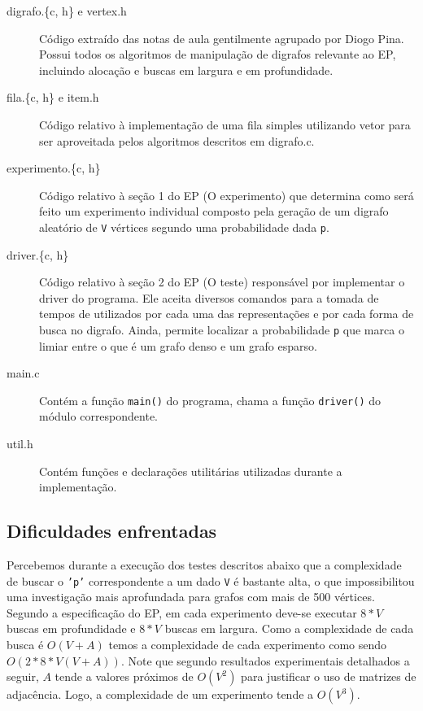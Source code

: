 \documentclass[brazil,times]{abnt}
\begin{document}
\begin{description}
	\item[digrafo.\{c, h\} e vertex.h] Código extraído das notas de aula gentilmente agrupado por Diogo Pina. Possui todos os algoritmos de manipulação de digrafos relevante ao EP, incluindo alocação e buscas em largura e em profundidade.
	\item[fila.\{c, h\} e item.h] Código relativo à implementação de uma fila simples utilizando vetor para ser aproveitada pelos algoritmos descritos em digrafo.c.
	\item[experimento.\{c, h\}] Código relativo à seção 1 do EP (O experimento) que determina como será feito um experimento individual composto pela geração de um digrafo aleatório de \texttt{V} vértices segundo uma probabilidade dada \texttt{p}.
	\item[driver.\{c, h\}] Código relativo à seção 2 do EP (O teste) responsável por implementar o driver do programa. Ele aceita diversos comandos para a tomada de tempos de utilizados por cada uma das representações e por cada forma de busca no digrafo. Ainda, permite localizar a probabilidade \texttt{p} que marca o limiar entre o que é um grafo denso e um grafo esparso.
	\item[main.c] Contém a função \texttt{main()} do programa, chama a função \texttt{driver()} do módulo correspondente.
	\item[util.h] Contém funções e declarações utilitárias utilizadas durante a implementação.
\end{description}


\subsection*{Dificuldades enfrentadas}
Percebemos durante a execução dos testes descritos abaixo que a complexidade de buscar o \texttt{'p'} correspondente a um dado \texttt{V} é bastante alta, o que impossibilitou uma investigação mais aprofundada para grafos com mais de 500 vértices. Segundo a especificação do EP, em cada experimento deve-se executar $8 * V$ buscas em profundidade e $8 * V$ buscas em largura. Como a complexidade de cada busca é $O(V + A)$ temos a complexidade de cada experimento como sendo $O(2 * 8 * V(V + A))$. Note que segundo resultados experimentais detalhados a seguir, $A$ tende a valores próximos de $O(V^2)$ para justificar o uso de matrizes de adjacência. Logo, a complexidade de um experimento tende a $O(V^3)$.
\end{document}
